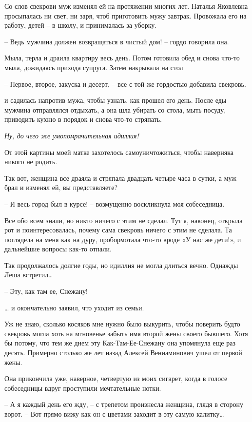 \documentclass[
]{book}
\begin{document}
Со слов свекрови муж изменял ей на протяжении многих лет. Наталья Яковлевна просыпалась ни свет, ни заря, чтоб приготовить мужу завтрак. Провожала его на работу, детей -- в школу, и принималась за уборку.

-- Ведь мужчина должен возвращаться в чистый дом! -- гордо говорила она.

Мыла, терла и драила квартиру весь день. Потом готовила обед и снова что-то мыла, дожидаясь прихода супруга. Затем накрывала на стол

-- Первое, второе, закуска и десерт, -- все с той же гордостью добавила свекровь.

и садилась напротив мужа, чтобы узнать, как прошел его день. После еды мужчина отправлялся отдыхать, а она шла убирать со стола, мыть посуду, приводить кухню в порядок и снова что-то стряпать.

\emph{Ну, до чего же умопомрачительная идиллия!}

От этой картины моей матке захотелось самоуничтожиться, чтобы наверняка никого не родить.

Так вот, женщина все драяла и стряпала двадцать четыре часа в сутки, а муж брал и изменял ей, вы представляете?

-- И весь город был в курсе! -- возмущенно воскликнула моя собеседница.

Все обо всем знали, но никто ничего с этим не сделал. Тут я, наконец, открыла рот и поинтересовалась, почему сама свекровь ничего с этим не сделала. Та поглядела на меня как на дуру, пробормотала что-то вроде «У нас же дети!», и дальнейшие вопросы как-то отпали.

Так продолжалось долгие годы, но идиллия не могла длиться вечно. Однажды Леша встретил\ldots{}

-- Эту, как там ее, Снежану!

\ldots{} и окончательно заявил, что уходит из семьи.

Уж не знаю, сколько косяков мне нужно было выкурить, чтобы поверить будто свекровь могла хоть на мгновенье забыть имя второй жены своего бывшего. Хотя бы потому, что тем же днем эту Как-Там-Ее-Снежану она упомянула еще раз десять. Примерно столько же лет назад Алексей Вениаминович ушел от первой жены.

Она прикончила уже, наверное, четвертую из моих сигарет, когда в голосе собеседницы вдруг проступили мечтательные нотки.

-- А я каждый день его жду, -- с трепетом произнесла женщина, глядя в сторону ворот. -- Вот прямо вижу как он с цветами заходит в эту самую калитку\ldots{}
\end{document}
